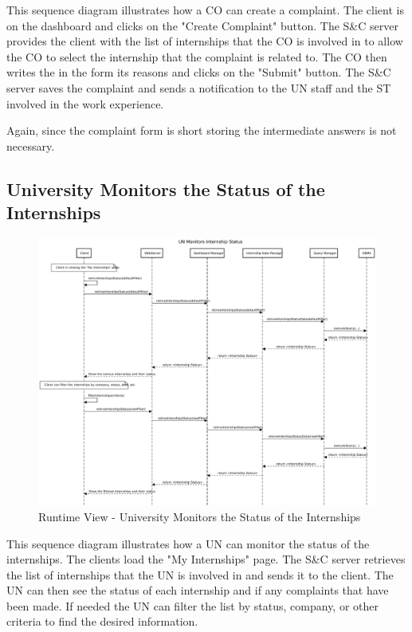 \par This sequence diagram illustrates how a CO can create a complaint. The client is on the dashboard and clicks
on the "Create Complaint" button. The S\&C server provides the client with the list of internships that the CO is
involved in to allow the CO to select the internship that the complaint is related to. The CO then writes the in the
form its reasons and clicks on the "Submit" button. The S\&C server saves the complaint and sends a notification to
the UN staff and the ST involved in the work experience.

\par Again, since the complaint form is short storing the intermediate answers is not necessary.


\subsection{University Monitors the Status of the Internships}
\label{sub:university-monitors-the-status-of-the-internships}%

\begin{figure}[H]
      \centering
      \includegraphics[width=1.0\textwidth]{Images/RV_12.pdf}
      \caption{Runtime View - University Monitors the Status of the Internships}
      \label{fig:rv-un-monitors-internships}
\end{figure}

\par This sequence diagram illustrates how a UN can monitor the status of the internships. The clients load the "My
Internships" page. The S\&C server retrieves the list of internships that the UN is involved in and sends it to the
client. The UN can then see the status of each internship and if any complaints that have been made. If needed the UN
can filter the list by status, company, or other criteria to find the desired information.

